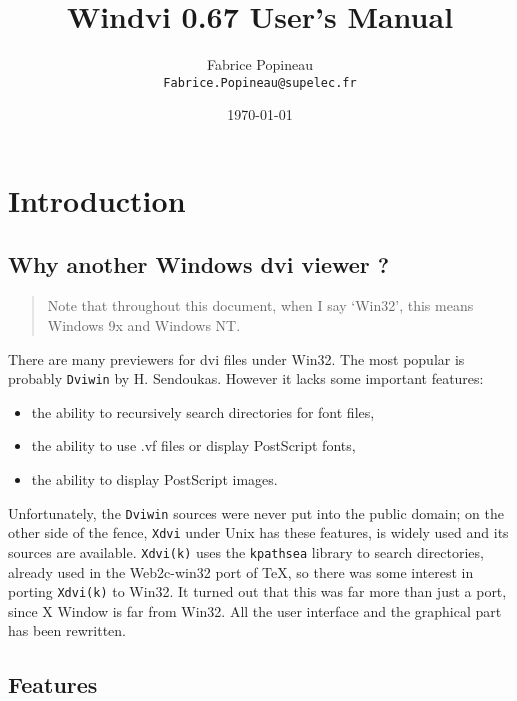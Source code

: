 \documentclass[a4paper,11pt]{article}
\begin{document}
\author{Fabrice Popineau\\
\texttt{Fabrice.Popineau@supelec.fr}}
\title{Windvi 0.67 User's Manual}
\date{\today}
\maketitle
\tableofcontents
\section{Introduction}

\subsection{Why another Windows dvi viewer ?}
\begin{quote}
Note that throughout this document, when I say
`Win32', this means Windows 9x and Windows NT.
\end{quote}

There are many previewers for dvi files under Win32. The most popular
is  probably \texttt{Dviwin} by  H. Sendoukas.  However it lacks some
important features:  
\begin{itemize}
\item the ability to  recursively search  directories for font files,
\item the ability to  use .vf files or display PostScript fonts,
\item the ability to  display PostScript images.
\end{itemize}

Unfortunately, the \texttt{Dviwin} sources were never put into the
public domain; on the other side of the fence, \texttt{Xdvi} under
Unix has these features, is widely used and its sources are available.
\texttt{Xdvi(k)} uses the \texttt{kpathsea} library to search
directories, already used in the Web2c-win32 port of \TeX, so there
was some interest in porting \texttt{Xdvi(k)} to Win32.  It turned
out that this was far more than just a port, since X Window is far
from Win32.  All the user interface and the graphical part has been
rewritten.

\subsection{Features}
\end{document}
